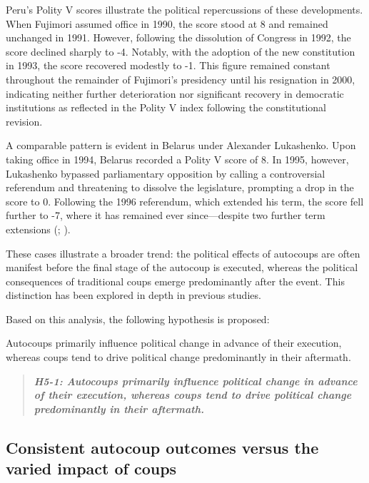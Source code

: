 \documentclass[
  12pt,
]{report}
\begin{document}
Peru's Polity V scores illustrate the political repercussions of these
developments. When Fujimori assumed office in 1990, the score stood at 8
and remained unchanged in 1991. However, following the dissolution of
Congress in 1992, the score declined sharply to -4. Notably, with the
adoption of the new constitution in 1993, the score recovered modestly
to -1. This figure remained constant throughout the remainder of
Fujimori's presidency until his resignation in 2000, indicating neither
further deterioration nor significant recovery in democratic
institutions as reflected in the Polity V index following the
constitutional revision.

A comparable pattern is evident in Belarus under Alexander Lukashenko.
Upon taking office in 1994, Belarus recorded a Polity V score of 8. In
1995, however, Lukashenko bypassed parliamentary opposition by calling a
controversial referendum and threatening to dissolve the legislature,
prompting a drop in the score to 0. Following the 1996 referendum, which
extended his term, the score fell further to -7, where it has remained
ever since---despite two further term extensions
(; ).

These cases illustrate a broader trend: the political effects of
autocoups are often manifest before the final stage of the autocoup is
executed, whereas the political consequences of traditional coups emerge
predominantly after the event. This distinction has been explored in
depth in previous studies.

Based on this analysis, the following hypothesis is proposed:

Autocoups primarily influence political change in advance of their
execution, whereas coups tend to drive political change predominantly in
their aftermath.

\begin{quote}
\textbf{\emph{H5-1: Autocoups primarily influence political change in
advance of their execution, whereas coups tend to drive political change
predominantly in their aftermath.}}
\end{quote}

\subsection*{Consistent autocoup outcomes versus the varied impact of
coups}\label{consistent-autocoup-outcomes-versus-the-varied-impact-of-coups}
\end{document}
